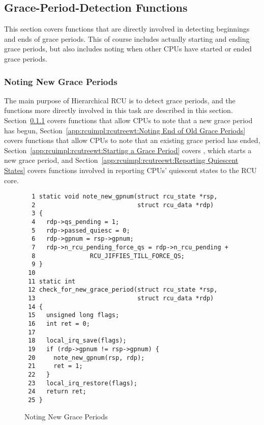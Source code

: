 \subsection{Grace-Period-Detection Functions}
\label{app:rcuimpl:rcutreewt:Grace-Period-Detection Functions}

This section covers functions that are directly involved in detecting
beginnings and ends of grace periods.
This of course includes actually starting and ending grace periods,
but also includes noting when other CPUs have started or ended
grace periods.

\subsubsection{Noting New Grace Periods}
\label{app:rcuimpl:rcutreewt:Noting New Grace Periods}

The main purpose of Hierarchical RCU is to detect grace periods,
and the functions more directly involved in this task are described
in this section.
Section~\ref{app:rcuimpl:rcutreewt:Noting New Grace Periods}
covers functions that allow CPUs to note that a new grace period has
begun,
Section~\ref{app:rcuimpl:rcutreewt:Noting End of Old Grace Periods}
covers functions that allow CPUs to note that an existing grace period
has ended,
Section~\ref{app:rcuimpl:rcutreewt:Starting a Grace Period}
covers , which starts a new grace period, and
Section~\ref{app:rcuimpl:rcutreewt:Reporting Quiescent States}
covers functions involved in reporting CPUs' quiescent states to
the RCU core.

\begin{figure}[tbp]
{ \scriptsize
\begin{verbatim}
  1 static void note_new_gpnum(struct rcu_state *rsp,
  2                            struct rcu_data *rdp)
  3 {
  4   rdp->qs_pending = 1;
  5   rdp->passed_quiesc = 0;
  6   rdp->gpnum = rsp->gpnum;
  7   rdp->n_rcu_pending_force_qs = rdp->n_rcu_pending +
  8               RCU_JIFFIES_TILL_FORCE_QS;
  9 }
 10
 11 static int
 12 check_for_new_grace_period(struct rcu_state *rsp,
 13                            struct rcu_data *rdp)
 14 {
 15   unsigned long flags;
 16   int ret = 0;
 17
 18   local_irq_save(flags);
 19   if (rdp->gpnum != rsp->gpnum) {
 20     note_new_gpnum(rsp, rdp);
 21     ret = 1;
 22   }
 23   local_irq_restore(flags);
 24   return ret;
 25 }
\end{verbatim}
}
\caption{Noting New Grace Periods}
\label{fig:app:rcuimpl:rcutreewt:Noting New Grace Periods}
\end{figure}

